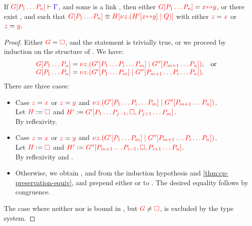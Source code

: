 \begin{lemmaB}\label{thm:cp-display-3}
  If $\seq[{ \cpPlug{G}{P_1 \dots P_n} }]{ \Gamma }$, and some  is a
  link , then either $\tm{\cpPlug{G}{P_1 \dots P_n}} =
  \tm{\cpLink{x}{y}}$, or there exist ,  and  such that
  \(
  \tm{\cpPlug{G}{P_1 \dots P_n}} \equiv
  \tm{\cpPlug{H}{\cpCut{z}{\cpPlug{H'}{\cpLink{x}{y}}}{Q}}}
  \)
  with either $\tm{z} = \tm{x}$ or $\tm{z} = \tm{y}$.
\end{lemmaB}
  \begin{proof}
    Either $\tm{G} = \tm{\Box}$, and the statement is trivially true, or we
    proceed by induction on the structure of . We have:
    \begin{gather*}
      \begin{array}[t]{ll}
        \tm{\cpPlug{G}{P_1 \dots P_n}} = \tm{\cpCut{z}{\cpPlug{G'}{P_1\dots P_i\dots P_m}}{\cpPlug{G''}{P_{m+1}\dots P_n}}},&\text{or}
        \\
        \tm{\cpPlug{G}{P_1 \dots P_n}} = \tm{\cpCut{z}{\cpPlug{G'}{P_1\dots P_m}}{\cpPlug{G''}{P_{m+1}\dots P_i\dots P_n}}}. 
      \end{array}
    \end{gather*}
    There are three cases:
    \begin{itemize}
    \item
      Case $\tm{z} = \tm{x}$ or $\tm{z} = \tm{y}$
      and $\tm{\cpCut{z}{\cpPlug{G'}{P_1\dots P_i\dots P_m}}{\cpPlug{G''}{P_{m+1}\dots P_n}}}$.
      \\
      Let $\tm{H} := \tm{\Box}$ and $\tm{H'} := \tm{\cpPlug{G'}{P_1\dots P_{j-1},\Box,P_{j+1}\dots P_m}}$.
      \\[1ex]
      By reflexivity.
    \item
      Case $\tm{z} = \tm{x}$ or $\tm{z} = \tm{y}$
      and $\tm{\cpCut{z}{\cpPlug{G'}{P_1\dots P_m}}{\cpPlug{G''}{P_{m+1}\dots P_i\dots P_n}}}$.
      \\
      Let $\tm{H} := \tm{\Box}$ and $\tm{H'} := \tm{\cpPlug{G''}{P_{m+1}\dots P_{i-1},\Box,P_{i+1}\dots P_n}}$.
      \\
      By reflexivity and \cpEquivCutComm.
    \item
      Otherwise, we obtain ,  and  from the induction
      hypothesis and \cref{thm:cp-preservation-equiv}, and prepend either
       or
       to .
      The desired equality follows by congruence.
    \end{itemize}
    The case where neither  nor  is bound in , but $\tm{G} \neq
    \tm{\Box}$, is excluded by the type system.
  \end{proof}
